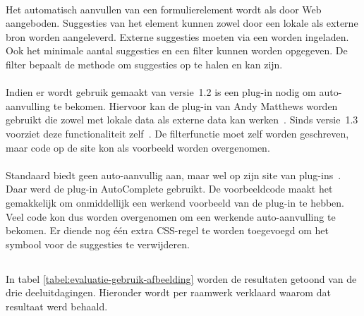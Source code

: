 \paragraph{\kendo}
Het automatisch aanvullen van een formulierelement wordt als  door \kendo{} Web aangeboden.
Suggesties van het element kunnen zowel door een lokale als externe bron worden aangeleverd.
Externe suggesties moeten via een  worden ingeladen.
Ook het minimale aantal suggesties en een filter kunnen worden opgegeven.
De filter bepaalt de methode om suggesties op te halen en kan  zijn.

\paragraph{\jqm}
Indien er wordt gebruik gemaakt van versie~1.2 is een plug-in nodig om auto-aanvulling te bekomen.
Hiervoor kan de plug-in van Andy Matthews worden gebruikt die zowel met lokale data als externe data kan werken~\cite{Matthews2013}. 
Sinds versie~1.3 voorziet \jqm{} deze functionaliteit zelf~\cite{JQuery2013c}.
De filterfunctie moet zelf worden geschreven, maar code op de site kon als voorbeeld worden overgenomen.

\paragraph{\lungo}
Standaard biedt \lungo{} geen auto-aanvullig aan, maar wel op zijn site van plug-ins~\cite{TapQuo2013b}.
Daar werd de plug-in AutoComplete gebruikt.
De voorbeeldcode maakt het gemakkelijk om onmiddellijk een werkend voorbeeld van de plug-in te hebben.
Veel code kon dus worden overgenomen om een werkende auto-aanvulling te bekomen.
Er diende nog één extra CSS-regel te worden toegevoegd om het symbool voor de suggesties te verwijderen.



\subsection{}
\label{sec:evaluatie-gebruik-afbeelding}

In tabel \ref{tabel:evaluatie-gebruik-afbeelding} worden de resultaten getoond van de drie deeluitdagingen.
Hieronder wordt per raamwerk verklaard waarom dat resultaat werd behaald.

